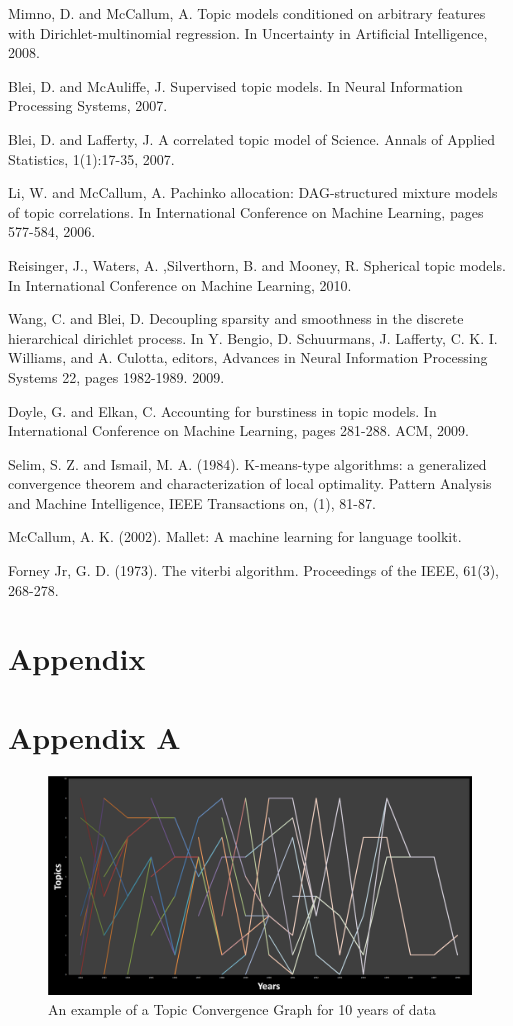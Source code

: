 \documentclass[conference]{IEEEtran}
\begin{document}
\begin{thebibliography}{1}
Mimno, D. and McCallum, A. Topic models conditioned on arbitrary features with Dirichlet-multinomial regression. In Uncertainty in Artificial Intelligence, 2008.

Blei, D. and McAuliffe, J. Supervised topic models. In Neural Information Processing Systems, 2007.

Blei, D. and Lafferty, J. A correlated topic model of Science. Annals of Applied Statistics, 1(1):17-35, 2007.

Li, W. and McCallum, A. Pachinko allocation: DAG-structured mixture models of topic correlations. In International Conference on Machine Learning, pages 577-584, 2006.

Reisinger, J., Waters, A. ,Silverthorn, B. and Mooney, R. Spherical topic models. In International Conference on Machine Learning, 2010.

Wang, C. and Blei, D. Decoupling sparsity and smoothness in the discrete hierarchical dirichlet process. In Y. Bengio, D. Schuurmans, J. Lafferty, C. K. I. Williams, and A. Culotta, editors, Advances in Neural Information Processing Systems 22, pages 1982-1989. 2009.

Doyle, G. and Elkan, C. Accounting for burstiness in topic models. In International Conference on Machine Learning, pages 281-288. ACM, 2009.

Selim, S. Z. and Ismail, M. A. (1984). K-means-type algorithms: a generalized convergence theorem and characterization of local optimality. Pattern Analysis and Machine Intelligence, IEEE Transactions on, (1), 81-87.


McCallum, A. K. (2002). Mallet: A machine learning for language toolkit.

Forney Jr, G. D. (1973). The viterbi algorithm. Proceedings of the IEEE, 61(3), 268-278.

\end{thebibliography}

\section{Appendix}
\section{Appendix A}
\begin{figure}[h]
	\center
	\includegraphics[width=1.3\textwidth, angle=270]{fig/tcg.png}
	\caption{An example of a Topic Convergence Graph for 10 years of data}
	\label{tcg}
\end{figure}




\end{document}
